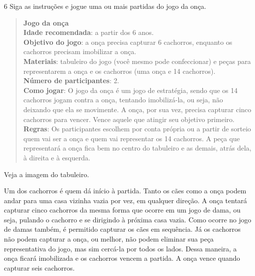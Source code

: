 \num{6} Siga as instruções e jogue uma ou mais partidas do jogo da onça.

\begin{quote}
\textbf{Jogo da onça}\\
\textbf{Idade recomendada}: a partir dos 6 anos.\\
\textbf{Objetivo do jogo}: a onça precisa capturar 6 cachorros, enquanto
os cachorros precisam imobilizar a onça.\\
\textbf{Materiais}: tabuleiro do jogo (você mesmo pode confeccionar) e
peças para representarem a onça e os cachorros (uma onça e 14
cachorros).\\
\textbf{Número de participantes}: 2.\\
\textbf{Como jogar}: O jogo da onça é um jogo de estratégia, sendo que
os 14 cachorros jogam contra a onça, tentando imobilizá-la, ou seja, não
deixando que ela se movimente. A onça, por sua vez, precisa capturar
cinco cachorros para vencer. Vence aquele que atingir seu objetivo
primeiro.\\
\textbf{Regras}: Os participantes escolhem por conta própria ou a partir
de sorteio quem vai ser a onça e quem vai representar os 14 cachorros. A
peça que representará a onça fica bem no centro do tabuleiro e as
demais, atrás dela, à direita e à esquerda.
\end{quote}

Veja a imagem do tabuleiro.


Um dos cachorros é quem dá início à partida. Tanto os cães como a onça
podem andar para uma casa vizinha vazia por vez, em qualquer direção. A
onça tentará capturar cinco cachorros da mesma forma que ocorre em um
jogo de dama, ou seja, pulando o cachorro e se dirigindo à próxima casa
vazia. Como ocorre no jogo de damas também, é permitido capturar os
cães em sequência. Já os cachorros não podem capturar a onça, ou melhor,
não podem eliminar sua peça representativa do jogo, mas sim cercá-la por
todos os lados. Dessa maneira, a onça ficará imobilizada e os cachorros
vencem a partida. A onça vence quando capturar seis cachorros.



